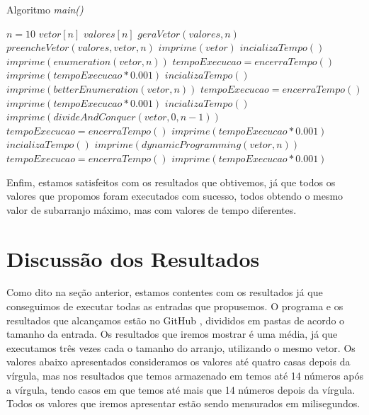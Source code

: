 \documentclass[
	12pt,				%
	oneside,   	        %
	a4paper,			%
	english,			%
	french,				%
	spanish,			%
	brazil,				%
	]{pacotes/abntex2}
\begin{document}
\begin{algorithm}[!htb]
\caption{Algoritmo \textit{main()}}
\label{algo:main}
\begin{algorithmic}[1]
        \State  $n = 10$    
        \State  $vetor[n]$
        \State  $valores[n]$
        \State  $geraVetor(valores, n)$
        \State  $preencheVetor(valores, vetor, n)$
        \State  $imprime(vetor)$
        \State  $incializaTempo()$
        \State  $imprime(enumeration(vetor, n))$
        \State  $tempoExecucao = encerraTempo()$
        \State  $imprime(tempoExecucao*0.001)$
        \State  $incializaTempo()$
        \State  $imprime(betterEnumeration(vetor, n))$
        \State  $tempoExecucao = encerraTempo()$
        \State  $imprime(tempoExecucao*0.001)$
        \State  $incializaTempo()$
        \State  $imprime(divideAndConquer(vetor, 0, n-1))$
        \State  $tempoExecucao = encerraTempo()$
        \State  $imprime(tempoExecucao*0.001)$
        \State  $incializaTempo()$
        \State  $imprime(dynamicProgramming(vetor, n))$
        \State  $tempoExecucao = encerraTempo()$
        \State  $imprime(tempoExecucao*0.001)$
        \State \Return
    \EndFunction
\end{algorithmic}
\end{algorithm}

Enfim, estamos satisfeitos com os resultados que obtivemos, já que todos os valores que propomos foram executados com sucesso, todos obtendo o mesmo valor de subarranjo máximo, mas com valores de tempo diferentes.

\clearpage
\section{Discussão dos Resultados}
\label{sec:discussao}
Como dito na seção anterior, estamos contentes com os resultados já que conseguimos de executar todas as entradas que propusemos. O programa e os resultados que alcançamos estão no GitHub \cite{KajiharaAndFonseca:2017}, divididos em pastas de acordo o tamanho da entrada. Os resultados que iremos mostrar é uma média, já que executamos três vezes cada o tamanho do arranjo, utilizando o mesmo vetor. Os valores abaixo apresentados consideramos os valores até quatro casas depois da vírgula, mas nos resultados que temos armazenado em \cite{KajiharaAndFonseca:2017} temos até 14 números após a vírgula, tendo casos em que temos até mais que 14 números depois da vírgula. Todos os valores que iremos apresentar estão sendo mensurados em milisegundos.
\end{document}

